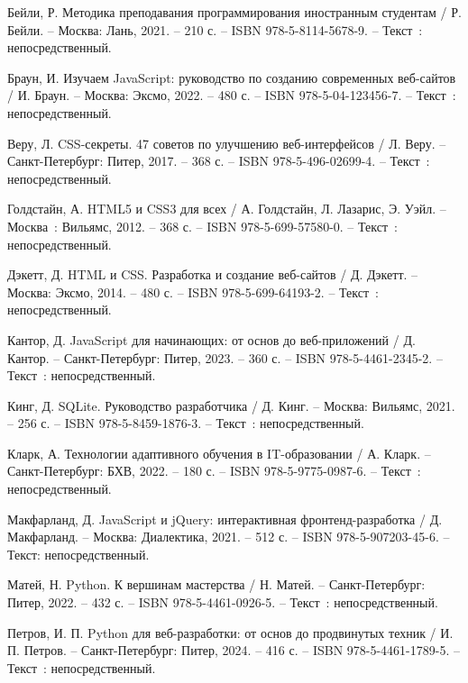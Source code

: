 
\begin{thebibliography}{9}

     Бейли, Р. Методика преподавания программирования иностранным студентам / Р. Бейли. – Москва: Лань, 2021. – 210 с. – ISBN 978-5-8114-5678-9. – Текст~: непосредственный.
    
     Браун, И. Изучаем JavaScript: руководство по созданию современных веб-сайтов / И. Браун. – Москва: Эксмо, 2022. – 480 с. – ISBN 978-5-04-123456-7. – Текст~: непосредственный.
    
     Веру, Л. CSS-секреты. 47 советов по улучшению веб-интерфейсов / Л. Веру. – Санкт-Петербург: Питер, 2017. – 368 с. – ISBN 978-5-496-02699-4. – Текст~: непосредственный.
    
    	Голдстайн, А. HTML5 и CSS3 для всех / А. Голдстайн, Л. Лазарис, Э. Уэйл. – Москва~: Вильямс, 2012. – 368 с. – ISBN 978-5-699-57580-0. – Текст~: непосредственный.
    
     Дэкетт, Д. HTML и CSS. Разработка и создание веб-сайтов / Д. Дэкетт. – Москва: Эксмо, 2014. – 480 с. – ISBN 978-5-699-64193-2. – Текст~: непосредственный.
	
     Кантор, Д. JavaScript для начинающих: от основ до веб-приложений / Д. Кантор. – Санкт-Петербург: Питер, 2023. – 360 с. – ISBN 978-5-4461-2345-2. – Текст~: непосредственный.
    
     Кинг, Д. SQLite. Руководство разработчика / Д. Кинг. – Москва: Вильямс, 2021. – 256 с. – ISBN 978-5-8459-1876-3. – Текст~: непосредственный.
    
     Кларк, А. Технологии адаптивного обучения в IT-образовании / А. Кларк. – Санкт-Петербург: БХВ, 2022. – 180 с. – ISBN 978-5-9775-0987-6. – Текст~: непосредственный.
    
     Макфарланд, Д. JavaScript и jQuery: интерактивная фронтенд-разработка / Д. Макфарланд. – Москва: Диалектика, 2021. – 512 с. – ISBN 978-5-907203-45-6. – Текст: непосредственный.  

     Матей, Н. Python. К вершинам мастерства / Н. Матей. – Санкт-Петербург: Питер, 2022. – 432 с. – ISBN 978-5-4461-0926-5. – Текст~: непосредственный.
	
	 Петров, И. П. Python для веб-разработки: от основ до продвинутых техник / И. П. Петров. – Санкт-Петербург: Питер, 2024. – 416 с. – ISBN 978-5-4461-1789-5. – Текст~: непосредственный.
	

\end{thebibliography}
